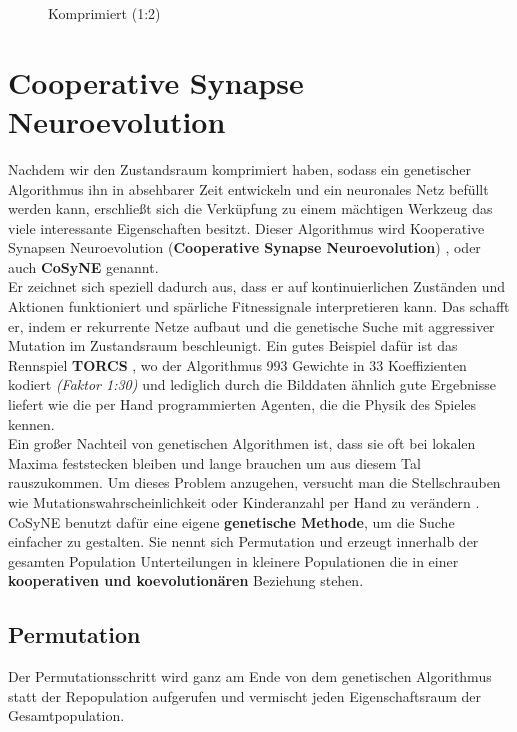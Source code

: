 \begin{multicols}{2}
\begin{figure}[H]
\begin{center}
                        \caption{Komprimiert (1:2)}\label{fig:dct-after}
                    \end{center}
                \end{figure}
            \end{multicols}

    \section{Cooperative Synapse Neuroevolution} \label{cosyne-definition}
        Nachdem wir den Zustandsraum komprimiert haben, sodass ein genetischer Algorithmus ihn in absehbarer Zeit entwickeln und ein neuronales Netz befüllt werden kann, erschließt sich die Verküpfung zu einem mächtigen Werkzeug das viele interessante Eigenschaften besitzt. Dieser Algorithmus wird Kooperative Synapsen Neuroevolution (\textbf{Cooperative Synapse Neuroevolution}) \cite{cosyne2}, oder auch \textbf{CoSyNE} genannt.\\

        \noindent
        Er zeichnet sich speziell dadurch aus, dass er auf kontinuierlichen Zuständen und Aktionen funktioniert und spärliche Fitnessignale interpretieren kann. Das schafft er, indem er rekurrente Netze aufbaut und die genetische Suche mit aggressiver Mutation im Zustandsraum beschleunigt. Ein gutes Beispiel dafür ist das Rennspiel \textbf{TORCS} \cite{cosyne3}, wo der Algorithmus 993 Gewichte in 33 Koeffizienten kodiert \textit{(Faktor 1:30)} und lediglich durch die Bilddaten ähnlich gute Ergebnisse liefert wie die per Hand programmierten Agenten, die die Physik des Spieles kennen.\\

        \noindent
        Ein großer Nachteil von genetischen Algorithmen ist, dass sie oft bei lokalen Maxima feststecken bleiben und lange brauchen um aus diesem Tal rauszukommen. Um dieses Problem anzugehen, versucht man die Stellschrauben wie Mutationswahrscheinlichkeit oder Kinderanzahl per Hand zu verändern \cite{grefenstette86}. CoSyNE benutzt dafür eine eigene \textbf{genetische Methode}, um die Suche einfacher zu gestalten. Sie nennt sich Permutation und erzeugt innerhalb der gesamten Population Unterteilungen in kleinere Populationen die in einer \textbf{kooperativen und koevolutionären} Beziehung stehen.
        \subsection{Permutation}
            Der Permutationsschritt wird ganz am Ende von dem genetischen Algorithmus statt der Repopulation aufgerufen und vermischt jeden \colorbox{green!25}{Eigenschaftsraum} der Gesamtpopulation. 

